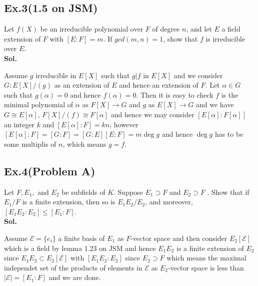 \documentclass[lang=en,11pt,a4paper,citestyle =authoryear]{elegantpaper}
\begin{document}
\subsection*{Ex.3(1.5 on JSM)} 
Let $f(X)$ be an irreducible polynomial over $F$ of degree $n$, and let $E$ a field extension of $F$ with $[E:F] = m$. If $gcd(m,n) = 1$, show that $f$ is irreducible over $E$.
\vspace{0.5em}\\
\textbf{Sol.} \par
    Assume $g$ irreducible in $E[X]$ such that $g|f$ in $E[X]$ and we consider $G:E[X]/(g)$ as an extension of $E$ and hence an extension of $F$. Let $\alpha \in G$ such that $g(\alpha) = 0$ and hence $f(\alpha) = 0$. Then it is easy to check $f$ is the minimal polynomial of $\alpha$ as $F[X] \to G$ and $g$ as $E[X] \to G$ and we have $G \cong E[\alpha]$, $F[X]/(f) \cong F[\alpha]$ and hence we may consider $[E[\alpha]:F[\alpha]]$ an integer $k$ and $[E[\alpha]:F] = kn$, however $[E[\alpha]:F] = [G:F] = [G:E][E:F] = m\deg g$ and hence $\deg g$ has to be some multiplis of $n$, which means $g = f$.
\par 
\vspace{0.5em}

\subsection*{Ex.4(Problem A)} 
Let $F , E_1,$ and $E_2$ be subfields of $K$. Suppose $E_1 \supset F$ and $E_2 \supset F$ . Show that if $E_1/F$ is a finite extension, then so is $E_1E_2/E_2$, and moreover,
$[E_1E_2 : E_2] \leq [E_1 : F ]$.
\vspace{0.5em}\\
\textbf{Sol.} \par
Assume $\mathcal{E} = \{e_i\}$ a finite basis of $E_1$ as $F$-vector space and then consider $E_2[\mathcal{E}]$ which is a field by lemma 1.23 on JSM and hence $E_1E_2$ is a finite extension of $E_2$ since $E_1E_2 \subset E_2[\mathcal{E}]$ with $[E_1E_2:E_2]$ since $E_2 \supset F$ which means the maximal independet set of the products of elements in $\mathcal{E}$ as $E_2$-vector space is less than $|\mathcal{E}| = [E_1:F]$ and we are done.
\par 
\vspace{0.5em}
\end{document}
